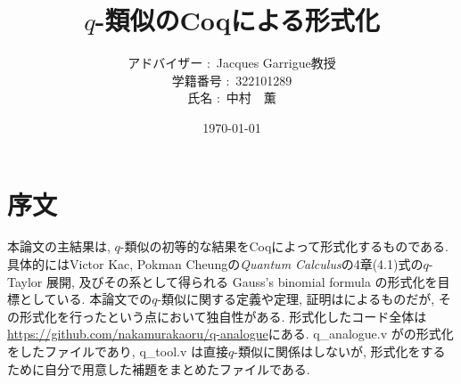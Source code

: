 \documentclass[11pt]{jsreport}
\theoremstyle{mystyle}
\newcommand{\0}{\textbf{0}}
\begin{document}
\title{$q$-類似のCoqによる形式化}
\author{アドバイザー $\colon$ Jacques Garrigue教授\\
           学籍番号 $\colon$ 322101289\\
           氏名 $\colon$ 中村　薫}
\date{\today}
\maketitle
\tableofcontents
\section*{序文}
本論文の主結果は, $q$-類似の初等的な結果をCoqによって形式化するものである. 具体的にはVictor Kac, Pokman Cheungの{\it Quantum Calculus}\cite{Kac}の4章(4.1)式の$q$-Taylor 展開, 及びその系として得られる Gauss's binomial formula の形式化を目標としている. 
本論文での$q$-類似に関する定義や定理, 証明は\cite{Kac}によるものだが, その形式化を行ったという点において独自性がある. 形式化したコード全体は\url{https://github.com/nakamurakaoru/q-analogue}\cite{coq qana}にある. q\_analogue.v が\cite{Kac}の形式化をしたファイルであり, q\_tool.v は直接$q$-類似に関係はしないが, 形式化をするために自分で用意した補題をまとめたファイルである. 
\end{document}
